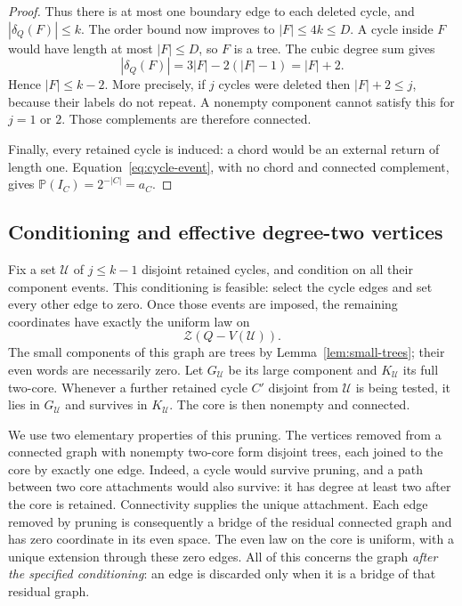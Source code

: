 \documentclass[11pt,a4paper]{article}
\numberwithin{equation}{section}
\theoremstyle{definition}
\theoremstyle{remark}
\newcommand{\cZ}{\mathcal Z}
\newcommand{\Prob}{\mathbb P}
\begin{document}
\begin{proof}
Thus there is at most one boundary edge to each deleted cycle, and $|\delta_Q(F)|\le k$. The order bound now improves to $|F|\le4k\le D$. A cycle inside $F$ would have length at most $|F|\le D$, so $F$ is a tree. The cubic degree sum gives
\[
 |\delta_Q(F)|=3|F|-2(|F|-1)=|F|+2.
\]
Hence $|F|\le k-2$. More precisely, if $j$ cycles were deleted then $|F|+2\le j$, because their labels do not repeat. A nonempty component cannot satisfy this for $j=1$ or $2$. Those complements are therefore connected.

Finally, every retained cycle is induced: a chord would be an external return of length one. Equation~\eqref{eq:cycle-event}, with no chord and connected complement, gives $\Prob(I_C)=2^{-|C|}=a_C$.
\end{proof}

\subsection{Conditioning and effective degree-two vertices}
Fix a set $\mathcal U$ of $j\le k-1$ disjoint retained cycles, and condition on all their component events. This conditioning is feasible: select the cycle edges and set every other edge to zero. Once those events are imposed, the remaining coordinates have exactly the uniform law on
\[
 \cZ(Q-V(\mathcal U)).
\]
The small components of this graph are trees by Lemma~\ref{lem:small-trees}; their even words are necessarily zero. Let $G_{\mathcal U}$ be its large component and $K_{\mathcal U}$ its full two-core. Whenever a further retained cycle $C'$ disjoint from $\mathcal U$ is being tested, it lies in $G_{\mathcal U}$ and survives in $K_{\mathcal U}$. The core is then nonempty and connected.

We use two elementary properties of this pruning. The vertices removed from a connected graph with nonempty two-core form disjoint trees, each joined to the core by exactly one edge. Indeed, a cycle would survive pruning, and a path between two core attachments would also survive: it has degree at least two after the core is retained. Connectivity supplies the unique attachment. Each edge removed by pruning is consequently a bridge of the residual connected graph and has zero coordinate in its even space. The even law on the core is uniform, with a unique extension through these zero edges. All of this concerns the graph \emph{after the specified conditioning}: an edge is discarded only when it is a bridge of that residual graph.
\end{document}
